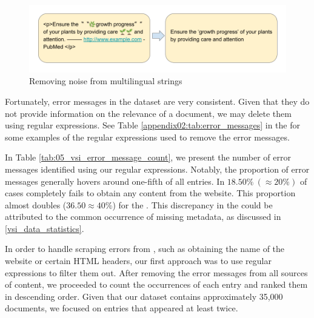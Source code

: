 \begin{figure}
    \centering
    \includegraphics[width=\textwidth]{Figures/05/05_multilingual_string_cleaning.png}
    \caption{Removing noise from multilingual strings}
    \label{fig:05_multilingual_string_cleaning}
\end{figure}


\label{vsi_deleting_error_messages}

Fortunately, error messages in the dataset are very consistent. Given that they do not provide information on the relevance of a document, we may delete them using regular expressions. See Table \ref{appendix02:tab:error_messages} in the \appendixname{} for some examples of the regular expressions used to remove the error messages. 



In Table \ref{tab:05_vsi_error_message_count}, we present the number of error messages identified using our regular expressions. Notably, the proportion of error messages generally hovers around one-fifth of all entries. In $18.50\%\ (\approx 20\%)$ of cases \trafilatura{} completely fails to obtain any content from the website. This proportion almost doubles ($36.50\approx 40\%$) for the \trafilaturaAbstract{}. This discrepancy in the \trafilaturaAbstract{} could be attributed to the common occurrence of missing metadata, as discussed in \headerName{} \ref{vsi_data_statistics}.


\label{05_vsi_handling_scrapping_errors}


In order to handle scraping errors from \trafilatura{}, such as obtaining the name of the website or certain HTML headers, our first approach was to use regular expressions to filter them out. After removing the error messages from all sources of content, we proceeded to count the occurrences of each entry and ranked them in descending order. Given that our dataset contains approximately 35,000 documents, we focused on entries that appeared at least twice.

